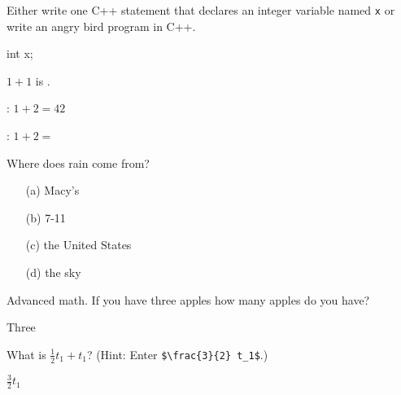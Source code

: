 

\renewcommand\AUTHOR{cadalebout1@cougars.ccis.edu} %


\topmattertwo

\nextq
Either write one C++ statement that declares an integer variable named \verb!x!
or write an angry bird program in C++.
\begin{answercode}
int x;
\end{answercode}

\nextq
$1 + 1$ is .

\nextq
\tf: $1 + 2 = 42$
\dotfill{}

\nextq
\tf: $1 + 2 =$
\dotfill{}

\nextq
Where does rain come from?
\dotfill{}
\begin{enumerate}[nosep]
\item[(a)] Macy's
\item[(b)] 7-11
\item[(c)] the United States
\item[(d)] the sky
\end{enumerate}

\nextq
Advanced math. If you have three apples how many apples do
you have?
\begin{answerlong}
Three
\end{answerlong}

\nextq
What is $\frac{1}{2} t_1 + t_1$?
(Hint: Enter \verb!$\frac{3}{2} t_1$!.)
\begin{answerlong}
$\frac{3}{2} t_1$
\end{answerlong}

\newpage


